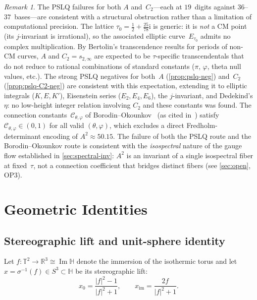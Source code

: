 \documentclass[11pt,a4paper]{article}
\theoremstyle{plain}
\theoremstyle{definition}
\theoremstyle{remark}
\newtheorem{remark}[theorem]{Remark}
\DeclareMathOperator{\Imag}{Im}
\newcommand{\RR}{\mathbb{R}}
\newcommand{\HH}{\mathbb{H}}            %
\newcommand{\T}{\mathbb{T}}             %
\newcommand{\ii}{\mathrm{i}}
\newcommand{\abs}[1]{\lvert #1 \rvert}
\begin{document}
\begin{remark}\label{rem:pslq-structural}
  The PSLQ failures for both $A$ and~$C_2$---each at $19$~digits
  against $36$--$37$~bases---are consistent with a
  structural obstruction rather than a limitation of
  computational precision.
  The lattice $\tau_0 = \tfrac12 + \tfrac{25}{78}\ii$
  is generic: it is \emph{not} a CM point (its $j$-invariant is
  irrational), so the associated elliptic curve~$E_{\tau_0}$
  admits no complex multiplication.  By Bertolin's
  transcendence results for periods of non-CM curves,
  $A$ and $C_2 = s_{2,\infty}$
  are expected to be $\tau$-specific transcendentals that
  do not reduce to rational combinations of standard
  constants ($\pi$, $\varphi$, theta null values, etc.).
  The strong PSLQ negatives for both~$A$
  (\cref{prop:pslq-neg}) and~$C_2$
  (\cref{prop:pslq-C2-neg}) are consistent with this expectation,
  extending it
  to elliptic integrals ($K, E, K'$), Eisenstein series
  ($E_2, E_4, E_6$), the $j$-invariant, and Dedekind's $\eta$:
  no low-height integer relation involving $C_2$ and these
  constants was found.
  The connection constants~$\mathcal{C}_{\theta,\varphi}$
  of Borodin--Okounkov~\cite{BO00} (as cited in~\cite[Eq.~D47]{DC26}) satisfy
  $\mathcal{C}_{\theta,\varphi} \in (0,1)$ for all valid
  $(\theta,\varphi)$, which excludes a direct Fredholm-determinant
  encoding of $A^2 \approx 50.15$.
  The failure of both the PSLQ route and the
  Borodin--Okounkov route is consistent with the
  \emph{isospectral} nature of the gauge flow established
  in \cref{sec:spectral-inv}: $A^2$ is an invariant of a
  single isospectral fiber at fixed~$\tau$, not a connection
  coefficient that bridges distinct fibers
  (see \cref{sec:open}, OP3).
\end{remark}


\section{Geometric Identities}\label{sec:analytical}

\subsection{Stereographic lift and unit-sphere identity}
\label{sec:unit-circle}
Let $f \colon \T^2 \to \RR^3 \cong \Imag\HH$ denote the immersion
of the isothermic torus and let
$x = \sigma^{-1}(f) \in S^3 \subset \HH$ be its stereographic lift:
\begin{equation}
  x_0 = \frac{\abs{f}^2 - 1}{\abs{f}^2 + 1}, \qquad
  x_{\mathrm{im}} = \frac{2f}{\abs{f}^2 + 1}.
  \label{eq:stereo-inv}
\end{equation}
\end{document}

